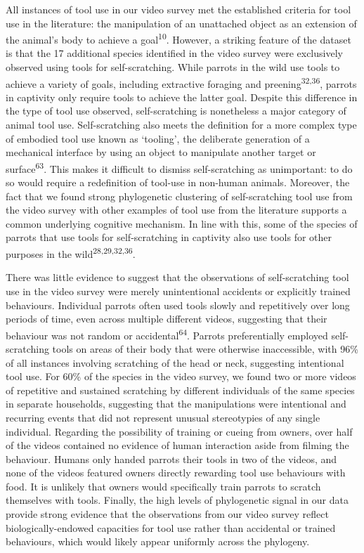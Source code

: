 \documentclass[
  man, donotrepeattitle,floatsintext]{apa6}
\begin{document}
All instances of tool use in our video survey met the established criteria for
tool use in the literature: the manipulation of an unattached object as an
extension of the animal's body to achieve a goal\textsuperscript{10}. However, a
striking feature of the dataset is that the 17 additional species identified in
the video survey were exclusively observed using tools for self-scratching.
While parrots in the wild use tools to achieve a variety of goals, including
extractive foraging and preening\textsuperscript{32,36}, parrots in captivity
only require tools to achieve the latter goal. Despite this difference in the
type of tool use observed, self-scratching is nonetheless a major category of
animal tool use. Self-scratching also meets the definition for a more complex
type of embodied tool use known as `tooling', the deliberate generation of a
mechanical interface by using an object to manipulate another target or surface\textsuperscript{63}. This makes it difficult to dismiss self-scratching as
unimportant: to do so would require a redefinition of tool-use in non-human
animals. Moreover, the fact that we found strong phylogenetic clustering of
self-scratching tool use from the video survey with other examples of tool use
from the literature supports a common underlying cognitive mechanism. In line
with this, some of the species of parrots that use tools for self-scratching in
captivity also use tools for other purposes in the wild\textsuperscript{28,29,32,36}.

There was little evidence to suggest that the observations of self-scratching
tool use in the video survey were merely unintentional accidents or explicitly
trained behaviours. Individual parrots often used tools slowly and repetitively
over long periods of time, even across multiple different videos, suggesting
that their behaviour was not random or accidental\textsuperscript{64}. Parrots
preferentially employed self-scratching tools on areas of their body that were
otherwise inaccessible, with 96\% of all instances involving scratching of the
head or neck, suggesting intentional tool use. For 60\% of the species in the
video survey, we found two or more videos of repetitive and sustained scratching
by different individuals of the same species in separate households, suggesting
that the manipulations were intentional and recurring events that did not
represent unusual stereotypies of any single individual. Regarding the
possibility of training or cueing from owners, over half of the videos contained
no evidence of human interaction aside from filming the behaviour. Humans only
handed parrots their tools in two of the videos, and none of the videos featured
owners directly rewarding tool use behaviours with food. It is unlikely that
owners would specifically train parrots to scratch themselves with tools.
Finally, the high levels of phylogenetic signal in our data provide strong
evidence that the observations from our video survey reflect
biologically-endowed capacities for tool use rather than accidental or trained
behaviours, which would likely appear uniformly across the phylogeny.
\end{document}
